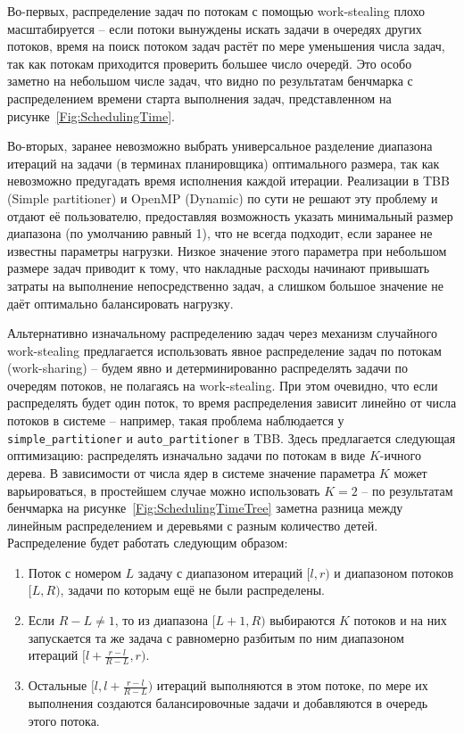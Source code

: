 \documentclass[times,specification,annotation]{itmo-student-thesis}
\begin{document}
Во-первых, распределение задач по потокам с помощью work-stealing плохо масштабируется -- если потоки вынуждены искать задачи в очередях других потоков, время на поиск потоком задач растёт по мере уменьшения числа задач, так как потокам приходится проверить большее число очередй. Это особо заметно на небольшом числе задач, что видно по результатам бенчмарка с распределением времени старта выполнения задач, представленном на рисунке~\ref{Fig:SchedulingTime}.

Во-вторых, заранее невозможно выбрать универсальное разделение диапазона итераций на задачи (в терминах планировщика) оптимального размера, так как невозможно предугадать время исполнения каждой итерации. Реализации в TBB (Simple partitioner) и OpenMP (Dynamic) по сути не решают эту проблему и отдают её пользователю, предоставляя возможность указать минимальный размер диапазона (по умолчанию равный 1), что не всегда подходит, если заранее не известны параметры нагрузки. Низкое значение этого параметра при небольшом размере задач приводит к тому, что накладные расходы начинают привышать затраты на выполнение непосредственно задач, а слишком большое значение не даёт оптимально балансировать нагрузку.

Альтернативно изначальному распределению задач через механизм случайного work-stealing предлагается использовать явное распределение задач по потокам (work-sharing) -- будем явно и детерминированно распределять задачи по очередям потоков, не полагаясь на work-stealing. При этом очевидно, что если распределять будет один поток, то время распределения зависит линейно от числа потоков в системе -- например, такая проблема наблюдается у \texttt{simple\_partitioner} и \texttt{auto\_partitioner} в TBB. Здесь предлагается следующая оптимизацию: распределять изначально задачи по потокам в виде $K$-ичного дерева. В зависимости от числа ядер в системе значение параметра $K$ может варьироваться, в простейшем случае можно использовать $K = 2$ -- по результатам бенчмарка на рисунке~\ref{Fig:SchedulingTimeTree} заметна разница между линейным распределением и деревьями с разным количество детей. Распределение будет работать следующим образом:
\begin{enumerate}[\hspace{18pt}1)]
    \item Поток с номером $L$ задачу с диапазоном итераций $[l, r)$ и диапазоном потоков $[L, R)$, задачи по которым ещё не были распределены.
    \item Если $R - L \neq 1$, то из диапазона $[L+1, R)$ выбираются $K$ потоков и на них запускается та же задача с равномерно разбитым по ним диапазоном итераций $[l + \frac{r-l}{R - L}, r)$.
    \item Остальные $[l, l + \frac{r-l}{R - L})$ итераций выполняются в этом потоке, по мере их выполнения создаются балансировочные задачи и добавляются в очередь этого потока.
\end{enumerate}
\end{document}
